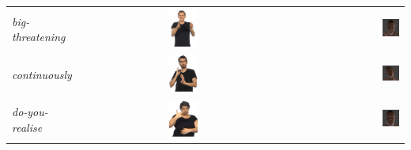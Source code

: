 \documentclass[../main.tex]{subfiles}
\begin{document}
\begin{longtable}{|l|c|r|}
    \emph{big-threatening} & \includegraphics[width=0.15\textwidth]{chapters/facial_expressions/images/original_facial_expressions/big_threatening.png} & \includegraphics[width=0.15\textwidth]{chapters/facial_expressions/images/flame_facial_exps/big_threatening.png} \\
    \emph{continuously} & \includegraphics[width=0.15\textwidth]{chapters/facial_expressions/images/original_facial_expressions/continuously.png} & \includegraphics[width=0.15\textwidth]{chapters/facial_expressions/images/flame_facial_exps/continuously.png} \\
    \emph{do-you-realise} & \includegraphics[width=0.15\textwidth]{chapters/facial_expressions/images/original_facial_expressions/do_you_realise.png} & \includegraphics[width=0.15\textwidth]{chapters/facial_expressions/images/flame_facial_exps/do_you_realise.png} \\

\end{longtable}
\end{document}
